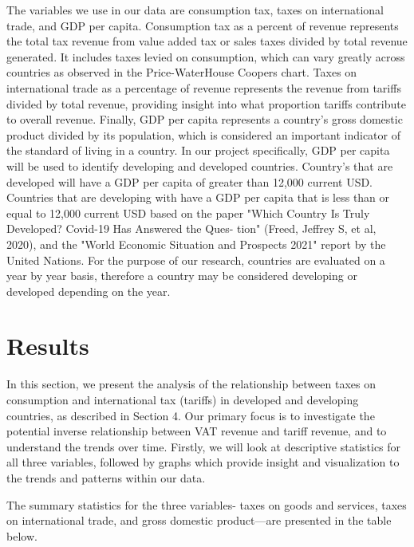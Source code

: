 \documentclass[12pt]{article}
\begin{document}
The variables we use in our data are consumption tax, taxes on international trade, and GDP per capita. Consumption tax as a percent of revenue represents the total tax revenue from value added tax or sales taxes divided by total revenue generated. It includes taxes levied on consumption, which can vary greatly across countries as observed in the Price-WaterHouse Coopers chart. Taxes on international trade as a percentage of revenue represents the revenue from tariffs divided by total revenue, providing insight into what proportion tariffs contribute to overall revenue. Finally, GDP per capita represents a country's gross domestic product divided by its population, which is considered an important indicator of the standard of living in a country. In our project specifically, GDP per capita will be used to identify developing and developed countries. Country's that are developed will have a GDP per capita of greater than 12,000 current USD. Countries that are developing with have a GDP per capita that is less than or equal to 12,000 current USD based on the paper "Which Country Is Truly Developed? Covid-19 Has Answered the Ques-
tion" (Freed, Jeffrey S, et al, 2020), and the "World Economic Situation and Prospects 2021" report by the United Nations. For the purpose of our research, countries are evaluated on a year by year basis, therefore a country may be considered developing or developed depending on the year. 

\section{Results}
\label{sec:result}

In this section, we present the analysis of the relationship between taxes on consumption and international tax (tariffs) in developed and developing countries, as described in Section 4. Our primary focus is to investigate the potential inverse relationship between VAT revenue and tariff revenue, and to understand the trends over time. Firstly, we will look at descriptive statistics for all three variables, followed by graphs which provide insight and visualization to the trends and patterns within our data.

The summary statistics for the three variables- taxes on goods and services, taxes on international trade, and gross domestic product—are presented in the table below.  
\end{document}
